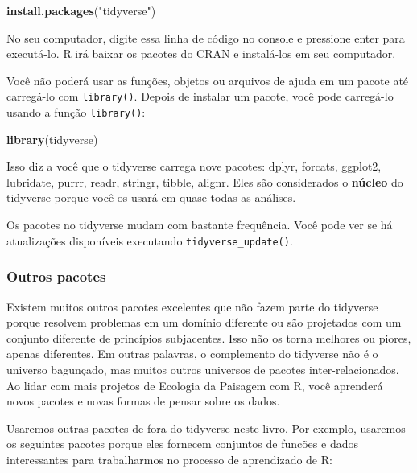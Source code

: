 \documentclass[
]{article}
\newenvironment{Shaded}{\begin{snugshade}}{\end{snugshade}}
\newcommand{\FunctionTok}[1]{\textcolor[rgb]{0.13,0.29,0.53}{\textbf{#1}}}
\newcommand{\NormalTok}[1]{#1}
\newcommand{\StringTok}[1]{\textcolor[rgb]{0.31,0.60,0.02}{#1}}
\begin{document}
\begin{Shaded}
\begin{Highlighting}[]
\FunctionTok{install.packages}\NormalTok{(}\StringTok{"tidyverse"}\NormalTok{)}
\end{Highlighting}
\end{Shaded}

No seu computador, digite essa linha de código no console e pressione enter para executá-lo.
R irá baixar os pacotes do CRAN e instalá-los em seu computador.

Você não poderá usar as funções, objetos ou arquivos de ajuda em um pacote até carregá-lo com \texttt{library()}.
Depois de instalar um pacote, você pode carregá-lo usando a função \texttt{library()}:

\begin{Shaded}
\begin{Highlighting}[]
\FunctionTok{library}\NormalTok{(tidyverse)}
\end{Highlighting}
\end{Shaded}

Isso diz a você que o tidyverse carrega nove pacotes: dplyr, forcats, ggplot2, lubridate, purrr, readr, stringr, tibble, alignr.
Eles são considerados o \textbf{núcleo} do tidyverse porque você os usará em quase todas as análises.

Os pacotes no tidyverse mudam com bastante frequência.
Você pode ver se há atualizações disponíveis executando \texttt{tidyverse\_update()}.

\hypertarget{outros-pacotes}{%
\subsubsection*{Outros pacotes}\label{outros-pacotes}}

Existem muitos outros pacotes excelentes que não fazem parte do tidyverse porque resolvem problemas em um domínio diferente ou são projetados com um conjunto diferente de princípios subjacentes.
Isso não os torna melhores ou piores, apenas diferentes.
Em outras palavras, o complemento do tidyverse não é o universo bagunçado, mas muitos outros universos de pacotes inter-relacionados.
Ao lidar com mais projetos de Ecologia da Paisagem com R, você aprenderá novos pacotes e novas formas de pensar sobre os dados.

Usaremos outras pacotes de fora do tidyverse neste livro.
Por exemplo, usaremos os seguintes pacotes porque eles fornecem conjuntos de funcões e dados interessantes para trabalharmos no processo de aprendizado de R:
\end{document}
